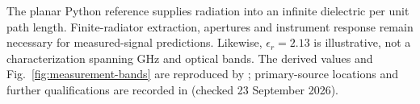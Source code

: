 \documentclass[11pt,a4paper]{article}
\numberwithin{equation}{section}
\begin{document}
The planar Python reference supplies radiation into an infinite dielectric
per unit path length. Finite-radiator extraction, apertures and instrument
response remain necessary for measured-signal predictions. Likewise,
\(\epsilon_r=2.13\) is illustrative, not a characterization spanning GHz
and optical bands. The derived values and Fig.~\ref{fig:measurement-bands}
are reproduced by ; primary-source
locations and further qualifications are recorded in
 (checked 23 September 2026).

\clearpage
\renewcommand{\bibsection}{\section{Literature and software references}}
\begingroup
{}

\endgroup
\end{document}
